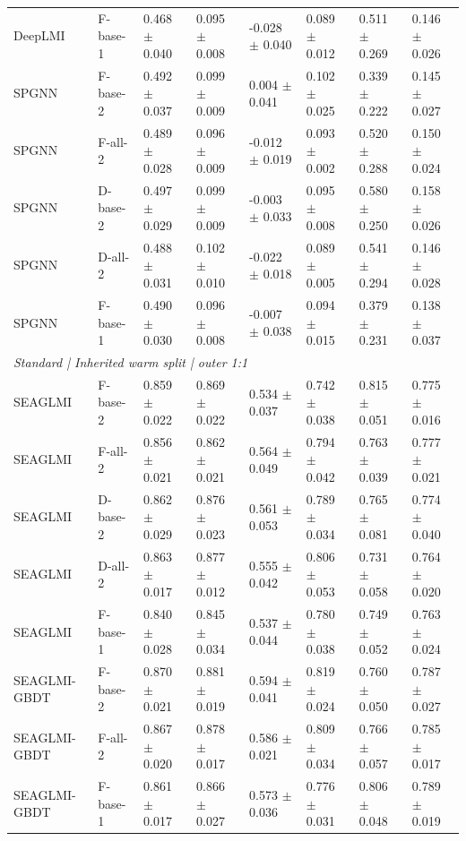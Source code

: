 \begin{landscape}
{\begin{longtable}{llllllll}
DeepLMI & F-base-1 & 0.468 $\pm$ 0.040 & 0.095 $\pm$ 0.008 & -0.028 $\pm$ 0.040 & 0.089 $\pm$ 0.012 & 0.511 $\pm$ 0.269 & 0.146 $\pm$ 0.026 \\
SPGNN & F-base-2 & 0.492 $\pm$ 0.037 & 0.099 $\pm$ 0.009 & 0.004 $\pm$ 0.041 & 0.102 $\pm$ 0.025 & 0.339 $\pm$ 0.222 & 0.145 $\pm$ 0.027 \\
SPGNN & F-all-2 & 0.489 $\pm$ 0.028 & 0.096 $\pm$ 0.009 & -0.012 $\pm$ 0.019 & 0.093 $\pm$ 0.002 & 0.520 $\pm$ 0.288 & 0.150 $\pm$ 0.024 \\
SPGNN & D-base-2 & 0.497 $\pm$ 0.029 & 0.099 $\pm$ 0.009 & -0.003 $\pm$ 0.033 & 0.095 $\pm$ 0.008 & 0.580 $\pm$ 0.250 & 0.158 $\pm$ 0.026 \\
SPGNN & D-all-2 & 0.488 $\pm$ 0.031 & 0.102 $\pm$ 0.010 & -0.022 $\pm$ 0.018 & 0.089 $\pm$ 0.005 & 0.541 $\pm$ 0.294 & 0.146 $\pm$ 0.028 \\
SPGNN & F-base-1 & 0.490 $\pm$ 0.030 & 0.096 $\pm$ 0.008 & -0.007 $\pm$ 0.038 & 0.094 $\pm$ 0.015 & 0.379 $\pm$ 0.231 & 0.138 $\pm$ 0.037 \\
\multicolumn{8}{l}{\textit{Standard | Inherited warm split | outer 1:1}}\\
SEAGLMI & F-base-2 & 0.859 $\pm$ 0.022 & 0.869 $\pm$ 0.022 & 0.534 $\pm$ 0.037 & 0.742 $\pm$ 0.038 & 0.815 $\pm$ 0.051 & 0.775 $\pm$ 0.016 \\
SEAGLMI & F-all-2 & 0.856 $\pm$ 0.021 & 0.862 $\pm$ 0.021 & 0.564 $\pm$ 0.049 & 0.794 $\pm$ 0.042 & 0.763 $\pm$ 0.039 & 0.777 $\pm$ 0.021 \\
SEAGLMI & D-base-2 & 0.862 $\pm$ 0.029 & 0.876 $\pm$ 0.023 & 0.561 $\pm$ 0.053 & 0.789 $\pm$ 0.034 & 0.765 $\pm$ 0.081 & 0.774 $\pm$ 0.040 \\
SEAGLMI & D-all-2 & 0.863 $\pm$ 0.017 & 0.877 $\pm$ 0.012 & 0.555 $\pm$ 0.042 & 0.806 $\pm$ 0.053 & 0.731 $\pm$ 0.058 & 0.764 $\pm$ 0.020 \\
SEAGLMI & F-base-1 & 0.840 $\pm$ 0.028 & 0.845 $\pm$ 0.034 & 0.537 $\pm$ 0.044 & 0.780 $\pm$ 0.038 & 0.749 $\pm$ 0.052 & 0.763 $\pm$ 0.024 \\
SEAGLMI-GBDT & F-base-2 & 0.870 $\pm$ 0.021 & 0.881 $\pm$ 0.019 & 0.594 $\pm$ 0.041 & 0.819 $\pm$ 0.024 & 0.760 $\pm$ 0.050 & 0.787 $\pm$ 0.027 \\
SEAGLMI-GBDT & F-all-2 & 0.867 $\pm$ 0.020 & 0.878 $\pm$ 0.017 & 0.586 $\pm$ 0.021 & 0.809 $\pm$ 0.034 & 0.766 $\pm$ 0.057 & 0.785 $\pm$ 0.017 \\
SEAGLMI-GBDT & F-base-1 & 0.861 $\pm$ 0.017 & 0.866 $\pm$ 0.027 & 0.573 $\pm$ 0.036 & 0.776 $\pm$ 0.031 & 0.806 $\pm$ 0.048 & 0.789 $\pm$ 0.019 \\

\end{longtable}}
\end{landscape}
